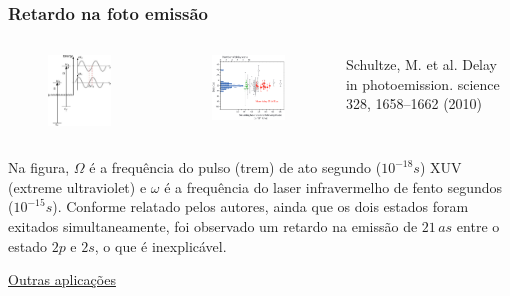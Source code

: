 \documentclass[12pt,brazil]{beamer}
\begin{document}
\begin{frame}
  \frametitle{Retardo na foto emissão}
  
  
    \begin{columns}[c]

      \column{5cm}
      \vspace*{-0.25cm} 
      \begin{figure}
        \includegraphics[width=4.5cm]{figuras/fig_n06}
      \end{figure}
      
      \column{5cm}
      \vspace*{-0.25cm}     
      \begin{figure}
        \includegraphics[width=5.25cm]{figuras/fig_n07}
      \end{figure}
      \fontsize{4pt}{0pt}\selectfont
    \vspace*{-0.25cm}     
      Schultze, M. et al. Delay in photoemission. science 328, 1658–1662 (2010)
    \end{columns}
  
    \vspace*{0.25cm} 
    \fontsize{8pt}{11pt}\selectfont
    Na figura, $\Omega$ é a frequência do pulso (trem) de ato segundo  ($10^{-18} s$) XUV (extreme ultraviolet) e $\omega$ é a frequência do laser infravermelho de fento segundos ($10^{-15} s$). Conforme relatado pelos autores, ainda que os dois estados foram exitados simultaneamente, foi observado um retardo na emissão de $21\, as$ entre o estado $2p$ e $2s$, o que é inexplicável.
  
    \vspace*{0.5cm}
      \fontsize{5pt}{11pt}\selectfont
      \href{https://www.youtube.com/watch?v=Vy71bJJ9EnU}{\color{blue} Outras aplicações}
\end{frame}
\end{document}
